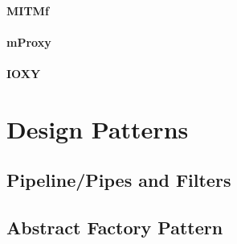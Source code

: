 \paragraph{MITMf} %

\paragraph{mProxy}
\paragraph{IOXY}

\section{Design Patterns}
\subsection{Pipeline/Pipes and Filters}
\subsection{Abstract Factory Pattern}
